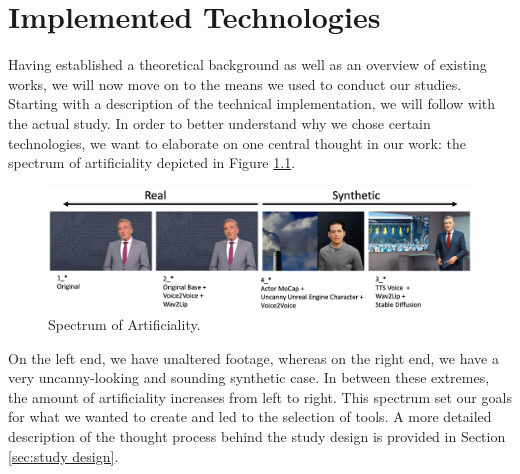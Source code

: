 \documentclass[
  a4paper,  %
  twoside,  %
  bibliography=totoc,
  headsepline,
  cleardoublepage=empty,
  parskip=half,
  draft=false
]{scrbook}
\begin{document}
\chapter{Implemented Technologies}
\label{chap:implementation}
Having established a theoretical background as well as an overview of existing works, we will now move on to the means we used to conduct our studies. Starting with a description of the technical implementation, we will follow with the actual study. In order to better understand why we chose certain technologies, we want to elaborate on one central thought in our work: the spectrum of artificiality depicted in Figure \ref{fig:spectrum}.

\begin{figure}[h]
  \centering
  \includegraphics[width=1\textwidth]{./graphics/spectrum-art.png}
  \caption{Spectrum of Artificiality.}
  \label{fig:spectrum}
\end{figure}

On the left end, we have unaltered footage, whereas on the right end, we have a very uncanny-looking and sounding synthetic case. In between these extremes, the amount of artificiality increases from left to right. This spectrum set our goals for what we wanted to create and led to the selection of tools. A more detailed description of the thought process behind the study design is provided in Section \ref{sec:study design}.
\end{document}
